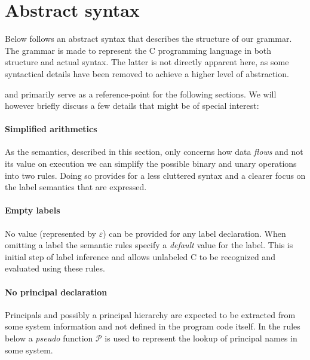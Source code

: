 \section{Abstract syntax}
Below follows an abstract syntax that describes the structure of our grammar.
The grammar is made to represent the C programming language in both structure and actual syntax.
The latter is not directly apparent here, as some syntactical details have been removed to achieve a higher level of abstraction.

 and  primarily serve as a reference-point for the following sections.
We will however briefly discuss a few details that might be of special interest:

\paragraph{Simplified arithmetics}
As the semantics, described in this section, only concerns how data \textit{flows} and not its value on execution we can simplify the possible binary and unary operations into two rules.
Doing so provides for a less cluttered syntax and a clearer focus on the label semantics that are expressed.

\paragraph{Empty labels}
No value (represented by $\varepsilon$) can be provided for any label declaration.
When omitting a label the semantic rules specify a \textit{default} value for the label.
This is initial step of label inference and allows unlabeled C to be recognized and evaluated using these rules.

\paragraph{No principal declaration}
Principals and possibly a principal hierarchy are expected to be extracted from some system information and not defined in the program code itself.
In the rules below a \textit{pseudo} function $\mathcal{P}$ is used to represent the lookup of principal names in some system.

